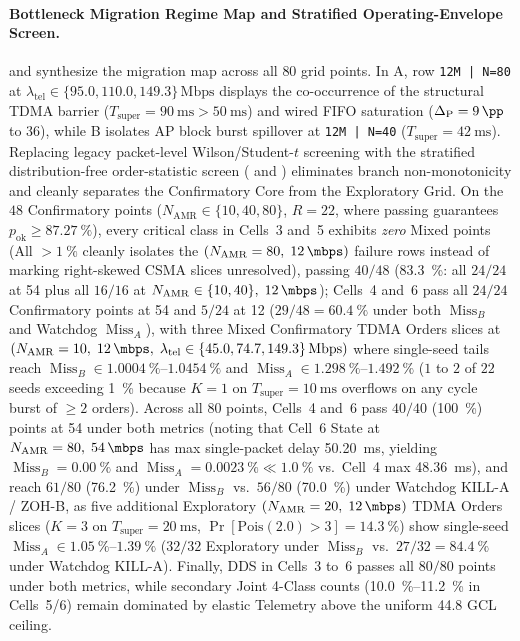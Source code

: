 \documentclass[11pt,a4paper]{article}
\newcommand{\Namr}{\ensuremath{N_{\mathrm{AMR}}}}
\newcommand{\ltel}{\ensuremath{\lambda_{\mathrm{tel}}}}
\newcommand{\Tsuper}{\ensuremath{T_{\mathrm{super}}}}
\newcommand{\MissA}{\ensuremath{\operatorname{Miss}_A}}
\newcommand{\MissB}{\ensuremath{\operatorname{Miss}_B}}
\newcommand{\GainP}{\ensuremath{\Delta_{\mathrm{P}}}}
\begin{document}
\paragraph{Bottleneck Migration Regime Map and Stratified Operating-Envelope Screen.}
 and  synthesize the migration map across all $80$ grid points. In A, row \texttt{12M | N=80} at $\ltel \in \{95.0, 110.0, 149.3\}\,\text{Mbps}$ displays the co-occurrence of the structural TDMA barrier ($\Tsuper = \qty{90}{\milli\second} > \qty{50}{\milli\second}$) and wired FIFO saturation ($\GainP = \qty{+9}{\pp}$ to \qty{+36}{\pp}), while B isolates AP block burst spillover at \texttt{12M | N=40} ($\Tsuper=\qty{42}{\milli\second}$). Replacing legacy packet-level Wilson/Student-$t$ screening with the stratified distribution-free order-statistic screen ( and ) eliminates branch non-monotonicity and cleanly separates the Confirmatory Core from the Exploratory Grid. On the $48$ Confirmatory points ($\Namr \in \{10, 40, 80\}$, $R=22$, where passing guarantees $p_{\mathrm{ok}} \ge \qty{87.27}{\percent}$), every critical class in Cells~3 and~5 exhibits \emph{zero} Mixed points (All $> \qty{1}{\percent}$ cleanly isolates the $(\Namr=80,\; \qty{12}{\mbps})$ failure rows instead of marking right-skewed CSMA slices unresolved), passing $40/48$ (\qty{83.3}{\percent}: all $24/24$ at \qty{54}{\mbps} plus all $16/16$ at $\Namr \in \{10, 40\},\; \qty{12}{\mbps}$); Cells~4 and~6 pass all $24/24$ Confirmatory points at \qty{54}{\mbps} and $5/24$ at \qty{12}{\mbps} ($29/48 = \qty{60.4}{\percent}$ under both $\MissB$ and Watchdog $\MissA$), with three Mixed Confirmatory TDMA Orders slices at $(\Namr=10,\; \qty{12}{\mbps},\; \ltel \in \{45.0, 74.7, 149.3\}\,\text{Mbps})$ where single-seed tails reach $\MissB \in \qtyrange{1.0004}{1.0454}{\percent}$ and $\MissA \in \qtyrange{1.298}{1.492}{\percent}$ ($1$ to $2$ of $22$ seeds exceeding \qty{1}{\percent} because $K=1$ on $\Tsuper = \qty{10}{\milli\second}$ overflows on any cycle burst of $\ge 2$ orders). Across all $80$ points, Cells~4 and~6 pass $40/40$ (\qty{100}{\percent}) points at \qty{54}{\mbps} under both metrics (noting that Cell~6 State at $\Namr=80,\; \qty{54}{\mbps}$ has max single-packet delay \qty{50.20}{\milli\second}, yielding $\MissB = \qty{0.00}{\percent}$ and $\MissA = \qty{0.0023}{\percent} \ll \qty{1.0}{\percent}$ vs.\ Cell~4 max \qty{48.36}{\milli\second}), and reach $61/80$ (\qty{76.2}{\percent}) under $\MissB$ vs.\ $56/80$ (\qty{70.0}{\percent}) under Watchdog KILL-A / ZOH-B, as five additional Exploratory $(\Namr=20,\; \qty{12}{\mbps})$ TDMA Orders slices ($K=3$ on $\Tsuper = \qty{20}{\milli\second}$, $\Pr[\mathrm{Pois}(2.0) > 3] = \qty{14.3}{\percent}$) show single-seed $\MissA \in \qtyrange{1.05}{1.39}{\percent}$ ($32/32$ Exploratory under $\MissB$ vs.\ $27/32 = \qty{84.4}{\percent}$ under Watchdog KILL-A). Finally, DDS in Cells~3 to~6 passes all $80/80$ points under both metrics, while secondary Joint 4-Class counts (\qtyrange{10.0}{11.2}{\percent} in Cells~5/6) remain dominated by elastic Telemetry above the uniform \qty{44.8}{\mbps} GCL ceiling.
\end{document}
